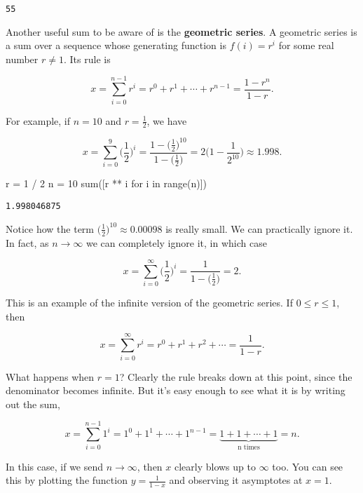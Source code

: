 \documentclass[
  letterpaper,
  DIV=11,
  numbers=noendperiod]{scrreprt}
\newenvironment{Shaded}{\begin{snugshade}}{\end{snugshade}}
\newcommand{\BuiltInTok}[1]{\textcolor[rgb]{0.00,0.23,0.31}{#1}}
\newcommand{\ControlFlowTok}[1]{\textcolor[rgb]{0.00,0.23,0.31}{#1}}
\newcommand{\DecValTok}[1]{\textcolor[rgb]{0.68,0.00,0.00}{#1}}
\newcommand{\KeywordTok}[1]{\textcolor[rgb]{0.00,0.23,0.31}{#1}}
\newcommand{\NormalTok}[1]{\textcolor[rgb]{0.00,0.23,0.31}{#1}}
\newcommand{\OperatorTok}[1]{\textcolor[rgb]{0.37,0.37,0.37}{#1}}
\begin{document}
\begin{verbatim}
55
\end{verbatim}

Another useful sum to be aware of is the \textbf{geometric series}. A
geometric series is a sum over a sequence whose generating function is
\(f(i) = r^i\) for some real number \(r \neq 1\). Its rule is

\[x = \sum_{i=0}^{n-1} r^i = r^0 + r^1 + \cdots + r^{n-1} = \frac{1-r^n}{1-r}.\]

For example, if \(n=10\) and \(r=\frac{1}{2}\), we have

\[x = \sum_{i=0}^{9} \bigg(\frac{1}{2}\bigg)^i = \frac{1-\big(\frac{1}{2}\big)^{10}}{1-\big(\frac{1}{2}\big)} = 2\bigg(1-\frac{1}{2^{10}}\bigg) \approx 1.998.\]

\begin{Shaded}
\begin{Highlighting}[]
\NormalTok{r }\OperatorTok{=} \DecValTok{1} \OperatorTok{/} \DecValTok{2}
\NormalTok{n }\OperatorTok{=} \DecValTok{10}
\BuiltInTok{sum}\NormalTok{([r }\OperatorTok{**}\NormalTok{ i }\ControlFlowTok{for}\NormalTok{ i }\KeywordTok{in} \BuiltInTok{range}\NormalTok{(n)])}
\end{Highlighting}
\end{Shaded}

\begin{verbatim}
1.998046875
\end{verbatim}

Notice how the term \(\big(\frac{1}{2}\big)^{10} \approx 0.00098\) is
really small. We can practically ignore it. In fact, as
\(n \rightarrow \infty\) we can completely ignore it, in which case

\[x = \sum_{i=0}^{\infty} \bigg(\frac{1}{2}\bigg)^i = \frac{1}{1-\big(\frac{1}{2}\big)} = 2.\]

This is an example of the infinite version of the geometric series. If
\(0 \leq r \leq 1\), then

\[x = \sum_{i=0}^{\infty} r^i = r^0 + r^1 + r^2 + \cdots = \frac{1}{1-r}.\]

What happens when \(r=1\)? Clearly the rule breaks down at this point,
since the denominator becomes infinite. But it's easy enough to see what
it is by writing out the sum,

\[x = \sum_{i=0}^{n-1} 1^i = 1^0 + 1^1 + \cdots + 1^{n-1} = \underbrace{1 + 1 + \cdots + 1}_{\text{n times}} = n.\]

In this case, if we send \(n \rightarrow \infty\), then \(x\) clearly
blows up to \(\infty\) too. You can see this by plotting the function
\(y = \frac{1}{1-x}\) and observing it asymptotes at \(x=1\).
\end{document}
